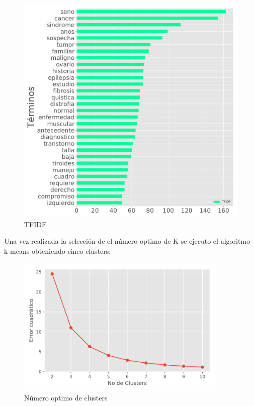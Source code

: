 \begin{figure}[] 
	\centering
	\includegraphics[width=1\textwidth]{Kap4/TFIDF1}
	\caption{TFIDF} 
	\label{fig:IDFTF}
\end{figure}

Una vez realizada la selección de el número optimo de K se ejecuto el algoritmo k-means obteniendo cinco clusters:

\begin{figure}[H] 
	\centering
	\includegraphics[width=0.9\textwidth]{Kap4/Clusters}
	\caption{Número optimo de clusters} 
	\label{fig:Clusters}
\end{figure}

